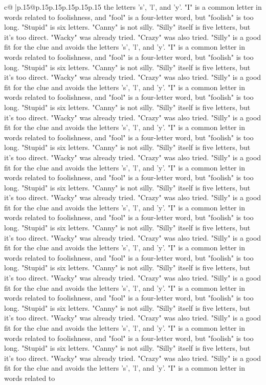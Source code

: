 \documentclass{article}
\begin{document}
{\begin{supertabular}{c@{$\;$}|p{.15\linewidth}@{}p{.15\linewidth}p{.15\linewidth}p{.15\linewidth}p{.15\linewidth}p{.15\linewidth}}
{{{the letters 's', 'l', and 'y'. "I" is a common letter in words related to foolishness, and "fool" is a four{-}letter word, but "foolish" is too long. "Stupid" is six letters. "Canny" is not silly. "Silly" itself is five letters, but it's too direct. "Wacky" was already tried. "Crazy" was also tried. "Silly" is a good fit for the clue and avoids the letters 's', 'l', and 'y'. "I" is a common letter in words related to foolishness, and "fool" is a four{-}letter word, but "foolish" is too long. "Stupid" is six letters. "Canny" is not silly. "Silly" itself is five letters, but it's too direct. "Wacky" was already tried. "Crazy" was also tried. "Silly" is a good fit for the clue and avoids the letters 's', 'l', and 'y'. "I" is a common letter in words related to foolishness, and "fool" is a four{-}letter word, but "foolish" is too long. "Stupid" is six letters. "Canny" is not silly. "Silly" itself is five letters, but it's too direct. "Wacky" was already tried. "Crazy" was also tried. "Silly" is a good fit for the clue and avoids the letters 's', 'l', and 'y'. "I" is a common letter in words related to foolishness, and "fool" is a four{-}letter word, but "foolish" is too long. "Stupid" is six letters. "Canny" is not silly. "Silly" itself is five letters, but it's too direct. "Wacky" was already tried. "Crazy" was also tried. "Silly" is a good fit for the clue and avoids the letters 's', 'l', and 'y'. "I" is a common letter in words related to foolishness, and "fool" is a four{-}letter word, but "foolish" is too long. "Stupid" is six letters. "Canny" is not silly. "Silly" itself is five letters, but it's too direct. "Wacky" was already tried. "Crazy" was also tried. "Silly" is a good fit for the clue and avoids the letters 's', 'l', and 'y'. "I" is a common letter in words related to foolishness, and "fool" is a four{-}letter word, but "foolish" is too long. "Stupid" is six letters. "Canny" is not silly. "Silly" itself is five letters, but it's too direct. "Wacky" was already tried. "Crazy" was also tried. "Silly" is a good fit for the clue and avoids the letters 's', 'l', and 'y'. "I" is a common letter in words related to foolishness, and "fool" is a four{-}letter word, but "foolish" is too long. "Stupid" is six letters. "Canny" is not silly. "Silly" itself is five letters, but it's too direct. "Wacky" was already tried. "Crazy" was also tried. "Silly" is a good fit for the clue and avoids the letters 's', 'l', and 'y'. "I" is a common letter in words related to foolishness, and "fool" is a four{-}letter word, but "foolish" is too long. "Stupid" is six letters. "Canny" is not silly. "Silly" itself is five letters, but it's too direct. "Wacky" was already tried. "Crazy" was also tried. "Silly" is a good fit for the clue and avoids the letters 's', 'l', and 'y'. "I" is a common letter in words related to foolishness, and "fool" is a four{-}letter word, but "foolish" is too long. "Stupid" is six letters. "Canny" is not silly. "Silly" itself is five letters, but it's too direct. "Wacky" was already tried. "Crazy" was also tried. "Silly" is a good fit for the clue and avoids the letters 's', 'l', and 'y'. "I" is a common letter in words related to }}}
\end{supertabular}}
\end{document}
